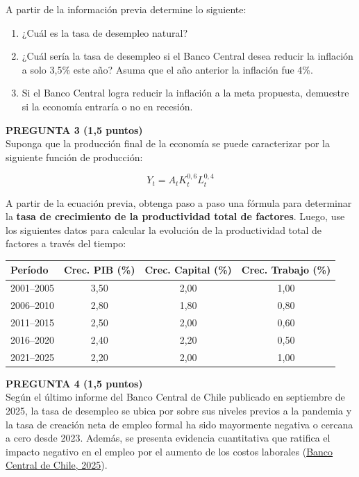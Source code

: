 \documentclass[11pt,addpoints]{article}
\begin{document}
A partir de la información previa determine lo siguiente:
\begin{enumerate}[label=\alph*)]
  \item ¿Cuál es la tasa de desempleo natural?
  \item ¿Cuál sería la tasa de desempleo si el Banco Central desea reducir la inflación a solo 3,5\% este año? Asuma que el año anterior la inflación fue 4\%.
  \item Si el Banco Central logra reducir la inflación a la meta propuesta, demuestre si la economía entraría o no en recesión.
\end{enumerate}

\newpage
\vspace*{0.5cm}

\textbf{PREGUNTA 3 (1,5 puntos)}\\[0.3cm]
Suponga que la producción final de la economía se puede caracterizar por la siguiente función de producción:

\[
Y_t = A_t K_t^{0{,}6} L_t^{0{,}4}
\]

A partir de la ecuación previa, obtenga paso a paso una fórmula para determinar la \textbf{tasa de crecimiento de la productividad total de factores}. Luego, use los siguientes datos para calcular la evolución de la productividad total de factores a través del tiempo:

\begin{center}
\begin{tabular}{lccc}
\toprule
\textbf{Período} & \textbf{Crec. PIB (\%)} & \textbf{Crec. Capital (\%)} & \textbf{Crec. Trabajo (\%)} \\
\midrule
2001–2005 & 3,50 & 2,00 & 1,00 \\
2006–2010 & 2,80 & 1,80 & 0,80 \\
2011–2015 & 2,50 & 2,00 & 0,60 \\
2016–2020 & 2,40 & 2,20 & 0,50 \\
2021–2025 & 2,20 & 2,00 & 1,00 \\
\bottomrule
\end{tabular}
\end{center}

\vspace{0.8cm}

\textbf{PREGUNTA 4 (1,5 puntos)}\\[0.3cm]
Según el último informe del Banco Central de Chile publicado en septiembre de 2025, la tasa de desempleo se ubica por sobre sus niveles previos a la pandemia y la tasa de creación neta de empleo formal ha sido mayormente negativa o cercana a cero desde 2023. Además, se presenta evidencia cuantitativa que ratifica el impacto negativo en el empleo por el aumento de los costos laborales (\href{https://www.bcentral.cl/documents/33528/7692839/IPoM+Septiembre+2025.pdf/af7fddd9-91c4-ac85-9f3a-3b71b6cf6ece}{Banco Central de Chile, 2025}).
\end{document}

